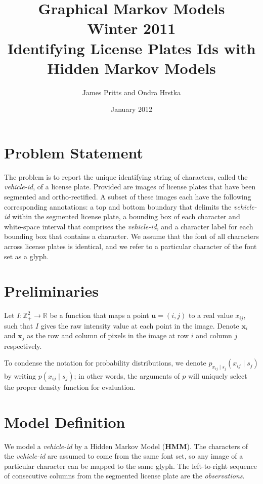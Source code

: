 \documentclass[a4paper,12pt]{article}
\title { \normalsize Graphical Markov Models \\ Winter 2011 \\
 \vspace{10mm} {\bf Identifying License Plates Ids with Hidden Markov
    Models } }
\author{\normalsize James Pritts and Ondra Hrstka }
\date{ \small January 2012 }
\renewcommand{\ohnote}[1]{} }
\begin{document}
\maketitle

\pagestyle{empty} \ohnote{This is useful way to leave notes. Both of
  us have command tu leave notes. I have \textbackslash ohnote, you
  have \textbackslash jpnote. Notes in whole document can be disabled
  by creating file with name ``.notes\_disabled''. }

\section{Problem Statement}
The problem is to report the unique identifying string of characters,
called the \emph{vehicle-id}, of a license plate.  Provided are images
of license plates that have been segmented and ortho-rectified. A
subset of these images each have the following corresponding
annotations: a top and bottom boundary that delimits the
\emph{vehicle-id} within the segmented license plate, a bounding box
of each character and white-space interval that comprises the
\emph{vehicle-id}, and a character label for each bounding box that
contains a character.  We assume that the font of all characters
across license plates is identical, and we refer to a particular
character of the font set as a glyph.

\section{Preliminaries}
Let $I\colon \mathbb{Z}^2_+ \to \mathbb{R}$ be a function that maps a
point $\mathbf{u} = (i,j)$ to a real value $x_{ij}$, such that $I$
gives the raw intensity value at each point in the image.  Denote
$\mathbf{x}_i$ and $\mathbf{x}_j$ as the row and column of pixels in
the image at row $i$ and column $j$ respectively.

To condense the notation for probability distributions, we denote
$p_{x_{ij} \mid s_j}(x_{ij} \mid s_j)$ by writing $p(x_{ij} \mid
s_j)$; in other words, the arguments of $p$ will uniquely select the
proper density function for evaluation.

\section{Model Definition}
We model a \emph{vehicle-id} by a Hidden Markov Model (\textbf{HMM}).
The characters of the \emph{vehicle-id} are assumed to come from the
same font set, so any image of a particular character can be mapped to
the same glyph.  The left-to-right sequence of consecutive columns
from the segmented license plate are the \emph{observations}.
\end{document}
